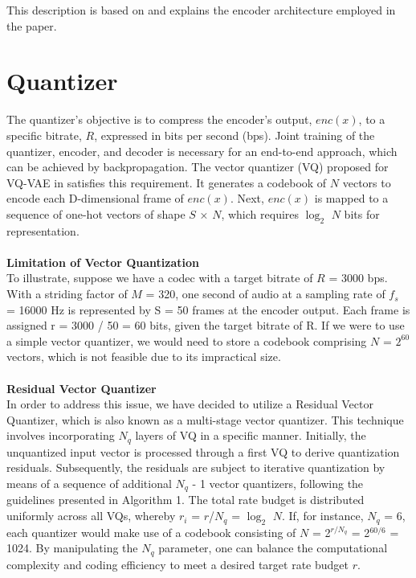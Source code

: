 \documentclass[12pt]{report}
\begin{document}
This description is based on \cite{opus_codec, evs_codec} and explains the encoder architecture employed in the paper.



\section{Quantizer}
The quantizer's objective is to compress the encoder's output, $enc(x)$, to a specific bitrate, $R$, expressed in bits per second (bps). Joint training of the quantizer, encoder, and decoder is necessary for an end-to-end approach, which can be achieved by backpropagation. The vector quantizer (VQ) proposed for VQ-VAE in \cite{oord2017neural} satisfies this requirement. It generates a codebook of $N$ vectors to encode each D-dimensional frame of $enc(x)$. Next, $enc(x)$ is mapped to a sequence of one-hot vectors of shape $S$ × $N$, which requires $\log_2$ $N$ bits for representation.\\\\
\textbf{Limitation of Vector Quantization} \\
To illustrate, suppose we have a codec with a target bitrate of $R$ = 3000 bps. With a striding factor of $M$ = 320, one second of audio at a sampling rate of $f_{s}$ = 16000 Hz is represented by S = 50 frames at the encoder output. Each frame is assigned r = 3000 / 50 = 60 bits, given the target bitrate of R. If we were to use a simple vector quantizer, we would need to store a codebook comprising $N$ = $2^{60}$ vectors, which is not feasible due to its impractical size.\\\\
\textbf{Residual Vector Quantizer}\\
In order to address this issue, we have decided to utilize a Residual Vector Quantizer, which is also known as a multi-stage vector quantizer. This technique involves incorporating $N_{q}$ layers of VQ in a specific manner. Initially, the unquantized input vector is processed through a first VQ to derive quantization residuals. Subsequently, the residuals are subject to iterative quantization by means of a sequence of additional $N_{q}$ - 1 vector quantizers, following the guidelines presented in Algorithm 1. The total rate budget is distributed uniformly across all VQs, whereby $r_i$ = $r$/$N_q$ = $\log_2$ $N$. If, for instance, $N_q$ = 6, each quantizer would make use of a codebook consisting of $N$ = 2$^{r/N_q}$ = 2$^{60/6}$ = 1024. By manipulating the $N_q$ parameter, one can balance the computational complexity and coding efficiency to meet a desired target rate budget $r$.
\end{document}
